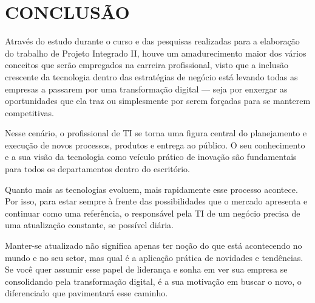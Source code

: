 
\chapter{CONCLUSÃO}
\label{chap:conclusao}

Através do estudo durante o curso e das pesquisas realizadas para a elaboração do trabalho de Projeto Integrado II, houve um amadurecimento maior dos vários conceitos que serão empregados na carreira profissional, visto que  a inclusão crescente da tecnologia dentro das estratégias de negócio está levando todas as empresas a passarem por uma transformação digital — seja por enxergar as oportunidades que ela traz ou simplesmente por serem forçadas para se manterem competitivas.

Nesse cenário, o profissional de TI se torna uma figura central do planejamento e execução de novos processos, produtos e entrega ao público. O seu conhecimento e a sua visão da tecnologia como veículo prático de inovação são fundamentais para todos os departamentos dentro do escritório.

Quanto mais as tecnologias evoluem, mais rapidamente esse processo acontece. Por isso, para estar sempre à frente das possibilidades que o mercado apresenta e continuar como uma referência, o  responsável pela TI de um negócio precisa de uma atualização constante, se possível diária.

Manter-se atualizado não significa apenas ter noção do que está acontecendo no mundo e no seu setor, mas qual é a aplicação prática de novidades e tendências. Se você quer assumir esse papel de liderança e sonha em ver sua empresa se consolidando pela transformação digital, é a sua motivação em buscar o novo, o diferenciado que pavimentará esse caminho.
